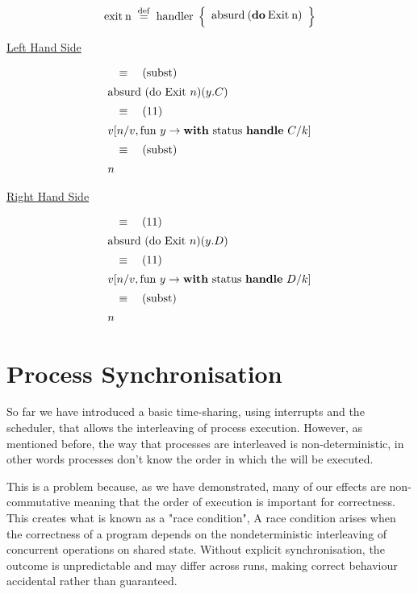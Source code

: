 \documentclass[logo,bsc,singlespacing,parskip]{infthesis}
\begin{document}
\[
\mathrm{exit\:n} \;\overset{\mathrm{def}}{=}\;
\mathrm{handler} \;\left\{
\begin{array}{l}
  \text{absurd\:(\textbf{do}\:Exit\:n)} \quad\\[0.5ex]

\end{array}
\right\}
\]



\underline{Left Hand Side}

\[
\begin{array}{l}
\quad\equiv\quad (\text{subst}) \\[5pt]
\text{absurd (do Exit } n) (y. C) \\[5pt]
\quad\equiv\quad (11) \\[5pt]
v [n/v, \text{fun } y \rightarrow \text{\textbf{with} status \textbf{handle} } C/k] \\[5pt]
\quad\equiv\quad (\text{subst}) \\[5pt]
n
\end{array}
\]

\underline{Right Hand Side}

\[
\begin{array}{l}
\quad\equiv\quad (11) \\[5pt]
\text{absurd (do Exit } n) (y. D) \\[5pt]
\quad\equiv\quad (11) \\[5pt]
v [n/v, \text{fun } y \rightarrow \text{\textbf{with} status \textbf{handle} } D/k] \\[5pt]
\quad\equiv\quad (\text{subst}) \\[5pt]
n
\end{array}
\]


\section{Process Synchronisation}

So far we have introduced a basic time-sharing, using interrupts and the scheduler, that allows the interleaving of process execution. However, as mentioned before, the way that processes are interleaved is non-deterministic, in other words processes don't know the order in which the will be executed. 

This is a problem because, as we have demonstrated, many of our effects are non-commutative meaning that the order of execution is important for correctness. This creates what is known as a "race condition", A race condition arises when the correctness of a program depends on the nondeterministic interleaving of concurrent operations on shared state. Without explicit synchronisation, the outcome is unpredictable and may differ across runs, making correct behaviour accidental rather than guaranteed.
\end{document}
